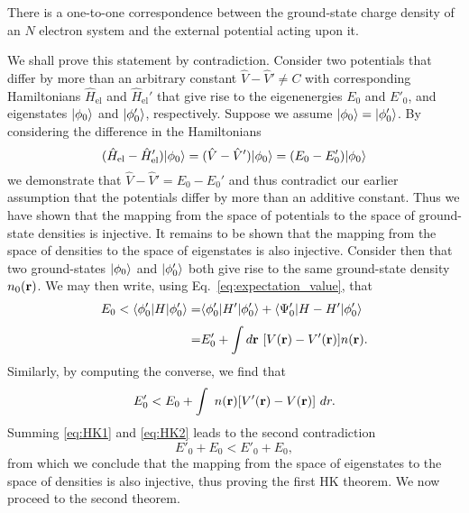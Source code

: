 \begin{HK1}
There is a one-to-one correspondence 
between the ground-state charge density 
of an $N$ electron system 
and the external potential acting upon it.
\end{HK1}
\noindent
We shall prove this statement by contradiction.
%
Consider two potentials 
that differ by more than an arbitrary constant
$\hat{V} - \hat{V}' \neq C$
with corresponding Hamiltonians 
$\hat{H}_\textrm{el}$ 
and $\hat{H}_\textrm{el}'$ 
that give rise to the  
eigenenergies $E_0$ and $E'_0$, 
and eigenstates $\vert\phi_0\rangle$ and $\vert\phi_0'\rangle$, 
respectively.
%
Suppose we assume 
$\vert\phi_0\rangle=\vert\phi_0'\rangle$.
%
By considering the difference in 
the Hamiltonians
\begin{equation}
(\hat{H}_\textrm{el}-\hat{H}_\textrm{el}')\vert\phi_0\rangle=(\hat{V}-\hat{V}')\vert\phi_0\rangle=(E_0-E_0')\vert\phi_0\rangle
\end{equation}
we demonstrate that 
$\hat{V}-\hat{V}'=E_0-E_0'$ 
and thus contradict our earlier assumption 
that the potentials differ by more than an 
additive constant.
%
Thus we have shown that the mapping 
from the space of potentials to the space 
of ground-state densities is injective.
%
It remains to be shown that the mapping 
from the space of densities to the space 
of eigenstates is also injective.
%
Consider then that two ground-states 
$\vert\phi_0\rangle$ and $\vert\phi_0'\rangle$
both give rise to the same 
ground-state density $n_0({\bf r})$.
%
We may then write, 
using Eq.~\eqref{eq:expectation_value}, 
that 
%
\begin{align}
E_0<\langle\phi'_0\vert H\vert\phi'_0\rangle
=&\langle\phi'_0\vert H'\vert\phi'_0\rangle+\langle\Psi'_0\vert H-H'\vert\phi'_0\rangle\nonumber\\[0.3em]
=&E'_0 + \int d{\bf r}\ [V({\bf r})-V'({\bf r})] n({\bf r}).
\label{eq:HK1}
\end{align}
%
Similarly, by computing the converse, we find {that}   
%
\begin{equation}
E'_0< E_0+\int\  n({\bf r}) [V'({\bf r})-V({\bf r})]\ dr.
\label{eq:HK2}
\end{equation}
%
Summing \eqref{eq:HK1} and \eqref{eq:HK2} 
leads to the second contradiction
%
\begin{equation}
E'_0+ E_0<E'_0+ E_0,
\end{equation}
%
from which we conclude that the mapping 
from the space of eigenstates 
to the space of densities 
is also injective, 
thus proving the first 
HK theorem.
%
We now proceed to the second theorem.

